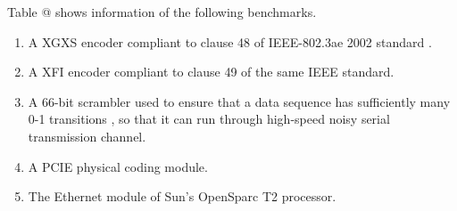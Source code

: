 \documentclass[journal]{IEEEtran}
\makeatletter
\newcommand{\Rmnum}[1]{\expandafter\@slowromancap\romannumeral #1@}
\makeatother
\begin{document}
Table \Rmnum{1} shows information of the following benchmarks.
\begin{enumerate}

\item A XGXS encoder compliant to clause 48 of IEEE-802.3ae 2002 standard \cite{IEEE80232002}.

\item A XFI encoder compliant to clause 49 of the same IEEE standard.

\item A 66-bit scrambler used to ensure
that a data sequence has sufficiently many 0-1 transitions
, so that it can run through high-speed
noisy serial transmission channel.

\item A PCIE physical coding module.

\item The Ethernet module of Sun's OpenSparc T2 processor.
\end{enumerate}
\end{document}
